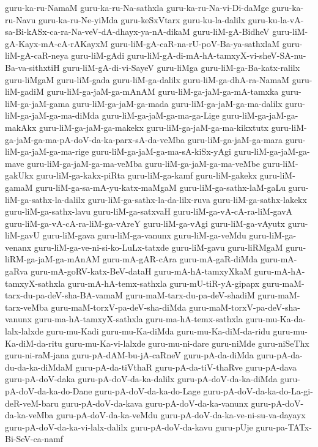 {guru-ka-ru-NamaM
guru-ka-ru-Na-sathxla
guru-ka-ru-Na-vi-Di-daMge
guru-ka-ru-Navu
guru-ka-ru-Ne-yiMda
guru-keSxVtarx
guru-ku-la-dalilx
guru-ku-la-vA-sa-Bi-kASx-ca-ra-Na-veV-dA-dhayx-ya-nA-dikaM
guru-liM-gA-BidheV
guru-liM-gA-Kayx-mA-cA-rAKayxM
guru-liM-gA-caR-na-rU-poV-Ba-ya-sathxlaM
guru-liM-gA-caR-neya
guru-liM-gAdi
guru-liM-gA-di-mA-hA-tamxyX-vi-sheV-SA-nu-Ba-va-sithxtiH
guru-liM-gA-di-vi-SayeV
guru-liMga
guru-liM-ga-Ba-katx-ralilx
guru-liMgaM
guru-liM-gada
guru-liM-ga-dalilx
guru-liM-ga-dhA-ra-NamaM
guru-liM-gadiM
guru-liM-ga-jaM-ga-mAnAM
guru-liM-ga-jaM-ga-mA-tamxka
guru-liM-ga-jaM-gama
guru-liM-ga-jaM-ga-mada
guru-liM-ga-jaM-ga-ma-dalilx
guru-liM-ga-jaM-ga-ma-diMda
guru-liM-ga-jaM-ga-ma-ga-Lige
guru-liM-ga-jaM-ga-makAkx
guru-liM-ga-jaM-ga-makekx
guru-liM-ga-jaM-ga-ma-kikxtutx
guru-liM-ga-jaM-ga-ma-pA-doV-da-ka-parx-sA-da-veMba
guru-liM-ga-jaM-ga-mara
guru-liM-ga-jaM-ga-ma-rige
guru-liM-ga-jaM-ga-ma-sA-kiSx-yAgi
guru-liM-ga-jaM-ga-mave
guru-liM-ga-jaM-ga-ma-veMba
guru-liM-ga-jaM-ga-ma-veMbe
guru-liM-gakUkx
guru-liM-ga-kakx-piRta
guru-liM-ga-kamf
guru-liM-gakekx
guru-liM-gamaM
guru-liM-ga-sa-mA-yu-katx-maMgaM
guru-liM-ga-sathx-laM-gaLu
guru-liM-ga-sathx-la-dalilx
guru-liM-ga-sathx-la-da-lilx-ruva
guru-liM-ga-sathx-lakekx
guru-liM-ga-sathx-lavu
guru-liM-ga-satxvaH
guru-liM-ga-vA-cA-ra-liM-gavA
guru-liM-ga-vA-cA-ra-liM-ga-vAreY
guru-liM-ga-vAgi
guru-liM-ga-vAyutx
guru-liM-gavU
guru-liM-gava
guru-liM-ga-vanunx
guru-liM-ga-veMdu
guru-liM-ga-venanx
guru-liM-ga-ve-ni-si-ko-LuLx-tatxde
guru-liM-gavu
guru-liRMgaM
guru-liRM-ga-jaM-ga-mAnAM
guru-mA-gAR-cAra
guru-mA-gaR-diMda
guru-mA-gaRva
guru-mA-goRV-katx-BeV-dataH
guru-mA-hA-tamxyXkaM
guru-mA-hA-tamxyX-sathxla
guru-mA-hA-temx-sathxla
guru-mU-tiR-yA-gipapx
guru-maM-tarx-du-pa-deV-sha-BA-vamaM
guru-maM-tarx-du-pa-deV-shadiM
guru-maM-tarx-veMba
guru-maM-torxV-pa-deV-sha-diMda
guru-maM-torxV-pa-deV-sha-vanunx
guru-ma-hA-tamxyX-sathxla
guru-ma-hA-temx-sathxla
guru-mu-Ka-da-lalx-lalxde
guru-mu-Kadi
guru-mu-Ka-diMda
guru-mu-Ka-diM-da-ridu
guru-mu-Ka-diM-da-ritu
guru-mu-Ka-vi-lalxde
guru-mu-ni-dare
guru-niMde
guru-niSeThx
guru-ni-raM-jana
guru-pA-dAM-bu-jA-caRneV
guru-pA-da-diMda
guru-pA-da-du-da-ka-diMdaM
guru-pA-da-tiVthaR
guru-pA-da-tiV-thaRve
guru-pA-dava
guru-pA-doV-daka
guru-pA-doV-da-ka-dalilx
guru-pA-doV-da-ka-diMda
guru-pA-doV-da-ka-do-Dane
guru-pA-doV-da-ka-do-Lage
guru-pA-doV-da-ka-do-La-gi-deR-veM-baru
guru-pA-doV-da-kava
guru-pA-doV-da-ka-vanunx
guru-pA-doV-da-ka-veMba
guru-pA-doV-da-ka-veMdu
guru-pA-doV-da-ka-ve-ni-su-va-dayayx
guru-pA-doV-da-ka-vi-lalx-dalilx
guru-pA-doV-da-kavu
guru-pUje
guru-pa-TATx-Bi-SeV-ca-namf
}
